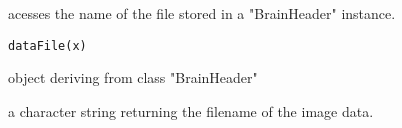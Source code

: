 \begin{Description}\relax
acesses the name of the file stored in a "BrainHeader" instance.
\end{Description}
\begin{Usage}
\begin{verbatim}
dataFile(x)
\end{verbatim}
\end{Usage}
\begin{Arguments}
\begin{ldescription}
\item[\code{x}] object deriving from class "BrainHeader" 
\end{ldescription}
\end{Arguments}
\begin{Value}
a character string returning the filename of the image data.
\end{Value}

